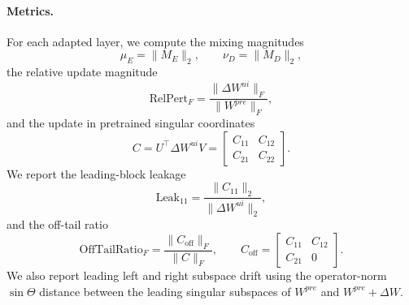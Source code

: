 \documentclass{article}
\begin{document}
\paragraph{Metrics.}
For each adapted layer, we compute the mixing magnitudes
\[
\mu_E = \|M_E\|_2,
\qquad
\nu_D = \|M_D\|_2,
\]
the relative update magnitude
\[
\mathrm{RelPert}_F =
\frac{\|\Delta W^{ui}\|_F}{\|W^{pre}\|_F},
\]
and the update in pretrained singular coordinates
\[
C = U^\top \Delta W^{ui} V
=
\begin{bmatrix}
C_{11} & C_{12}\\
C_{21} & C_{22}
\end{bmatrix}.
\]
We report the leading-block leakage
\[
\mathrm{Leak}_{11}
=
\frac{\|C_{11}\|_2}{\|\Delta W^{ui}\|_2},
\]
and the off-tail ratio
\[
\mathrm{OffTailRatio}_F
=
\frac{\|C_{\mathrm{off}}\|_F}{\|C\|_F},
\qquad
C_{\mathrm{off}}
=
\begin{bmatrix}
C_{11} & C_{12}\\
C_{21} & 0
\end{bmatrix}.
\]
We also report leading left and right subspace drift using the operator-norm
\(\sin\Theta\) distance between the leading singular subspaces of
\(W^{pre}\) and \(W^{pre}+\Delta W\).
\end{document}
